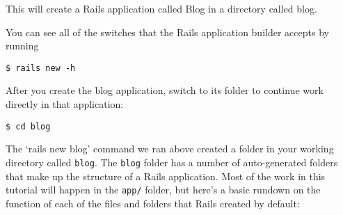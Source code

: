 \documentclass[10pt]{book}
\begin{document}
This will create a Rails application called Blog in a directory called blog.

You can see all of the switches that the Rails application builder accepts by running

\begin{verbatim}
$ rails new -h
\end{verbatim}

After you create the blog application, switch to its folder to continue work directly in that application:
\begin{verbatim}
$ cd blog
\end{verbatim}

The ‘rails new blog’ command we ran above created a folder in your working directory called \texttt{blog}. The \texttt{blog} folder has a number of auto-generated folders that make up the structure of a Rails application. Most of the work in this tutorial will happen in the \texttt{app/} folder, but here’s a basic rundown on the function of each of the files and folders that Rails created by default:
\\ \\
\end{document}
